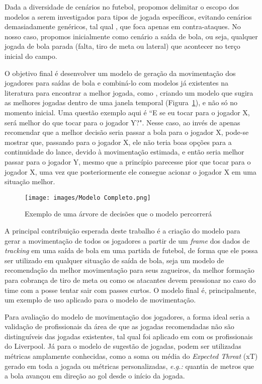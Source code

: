 \documentclass[12pt]{article}
\begin{document}
Dada a diversidade de cenários no futebol, propomos delimitar o escopo dos modelos a serem investigados para tipos de jogada específicos, evitando cenários demasiadamente genéricos, tal qual \cite{graphcounteratack}, que foca apenas em contra-ataques. No nosso caso, propomos inicialmente como cenário a saída de bola, ou seja, qualquer jogada de bola parada (falta, tiro de meta ou lateral) que acontecer no terço inicial do campo. 

O objetivo final é desenvolver um modelo de geração da movimentação dos jogadores para saídas de bola e combiná-lo com modelos já existentes na literatura para encontrar a melhor jogada, como \cite{power2017not}, criando um modelo que sugira as melhores jogadas dentro de uma janela temporal (Figura~\ref{fig:modelo-completo}), e não só no momento inicial. Uma questão exemplo aqui é ``E se eu tocar para o jogador X, será melhor do que tocar para o jogador Y?". Nesse caso, ao invés de apenas recomendar que a melhor decisão seria passar a bola para o jogador X, pode-se mostrar que, passando para o jogador X, ele não teria boas opções para a continuidade do lance, devido à movimentação estimada, e então seria melhor passar para o jogador Y, mesmo que a princípio parecesse pior que tocar para o jogador X, uma vez que posteriormente ele consegue acionar o jogador X em uma situação melhor. 

\begin{figure}
    \centering
    \texttt{[image: images/Modelo Completo.png]}
    \caption{Exemplo de uma árvore de decisões que o modelo percorrerá}
    \label{fig:modelo-completo}
\end{figure}

A principal contribuição esperada deste trabalho é a criação do modelo para gerar a movimentação de todos os jogadores a partir de um \textit{frame} dos dados de \textit{tracking} em uma saída de bola em uma partida de futebol, de forma que ele possa ser utilizado em qualquer situação de saída de bola, seja um modelo de recomendação da melhor movimentação para seus zagueiros, da melhor formação para cobrança de tiro de meta ou como os atacantes devem pressionar no caso do time com a posse tentar sair com passes curtos. O modelo final é, principalmente, um exemplo de uso aplicado para o modelo de movimentação.  

Para avaliação do modelo de movimentação dos jogadores, a forma ideal seria a validação de profissionais da área de que as jogadas recomendadas não são distinguíveis das jogadas existentes, tal qual foi aplicado em \cite{tacticai} com os profissionais do Liverpool. Já para o modelo de sugestão de jogadas, podem ser utilizadas métricas amplamente conhecidas, como a soma ou média do \textit{Expected Threat} (xT) gerado em toda a jogada ou métricas personalizadas, \textit{e.g.:} quantia de metros que a bola avançou em direção ao gol desde o início da jogada. 
\end{document}

